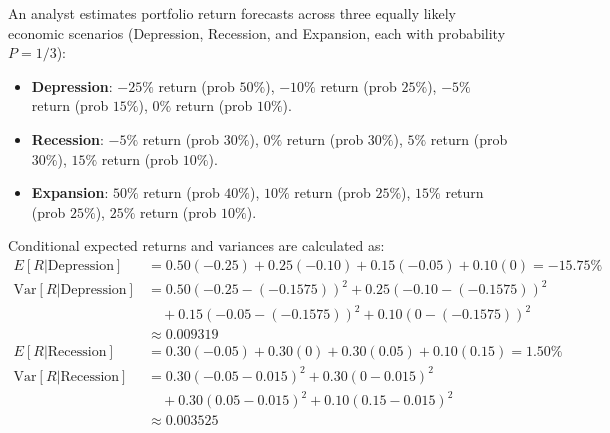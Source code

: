 
\begin{tcolorbox}[
	colback=gray!5!white,
	colframe=black!15!white,
	boxrule=0.5pt,
	arc=3pt,
	title=\textbf{Case Study: Scenario Expected Returns and Variances},
	coltitle=black,
	colbacktitle=black!5!white,
	before skip=6pt,
	after skip=6pt,
	breakable
]
An analyst estimates portfolio return forecasts across three equally likely economic scenarios (Depression, Recession, and Expansion, each with probability $P = 1/3$):
\begin{itemize}
	\item \textbf{Depression}: $-25\%$ return (prob $50\%$), $-10\%$ return (prob $25\%$), $-5\%$ return (prob $15\%$), $0\%$ return (prob $10\%$).
	\item \textbf{Recession}: $-5\%$ return (prob $30\%$), $0\%$ return (prob $30\%$), $5\%$ return (prob $30\%$), $15\%$ return (prob $10\%$).
	\item \textbf{Expansion}: $50\%$ return (prob $40\%$), $10\%$ return (prob $25\%$), $15\%$ return (prob $25\%$), $25\%$ return (prob $10\%$).
\end{itemize}
Conditional expected returns and variances are calculated as:
\begin{align*}
	E[R|\text{Depression}] &= 0.50(-0.25) + 0.25(-0.10) + 0.15(-0.05) + 0.10(0) = -15.75\% \\
	\text{Var}[R|\text{Depression}] &= 0.50(-0.25 - (-0.1575))^2 + 0.25(-0.10 - (-0.1575))^2 \\
	&\quad + 0.15(-0.05 - (-0.1575))^2 + 0.10(0 - (-0.1575))^2 \\
	&\approx 0.009319 \\[1ex]
	E[R|\text{Recession}] &= 0.30(-0.05) + 0.30(0) + 0.30(0.05) + 0.10(0.15) = 1.50\% \\
	\text{Var}[R|\text{Recession}] &= 0.30(-0.05 - 0.015)^2 + 0.30(0 - 0.015)^2 \\
	&\quad + 0.30(0.05 - 0.015)^2 + 0.10(0.15 - 0.015)^2 \\
	&\approx 0.003525 \\[1ex]

\end{align*}
\end{tcolorbox}
